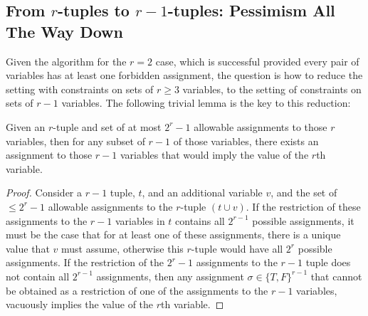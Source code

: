 \documentclass[anon,12pt]{colt2018}
\begin{document}
\subsection{From $r$-tuples to $r-1$-tuples: Pessimism All The Way Down}\label{sec:intuitRed} 

Given the algorithm for the $r=2$ case, which is successful provided every pair of variables has at least one forbidden assignment, the question is how to reduce the setting with constraints on sets of $r \ge 3$ variables, to the setting of constraints on sets of $r-1$ variables.   The following trivial lemma is the key to this reduction:

\begin{lemma}\label{lemma:eitherway}
Given an $r$-tuple and set of at most $2^{r}-1$ allowable assignments to those $r$ variables, then for any subset of $r-1$ of those variables, there exists an assignment to those $r-1$ variables that would imply the value of the $r$th variable.  
\end{lemma}
\begin{proof}
Consider a $r-1$ tuple, $t$, and an additional variable $v$, and the set of $\le 2^{r}-1$ allowable assignments to the $r$-tuple $(t \cup v)$.  If the restriction of these assignments to the $r-1$ variables in $t$ contains all $2^{r-1}$ possible assignments, it must be the case that for at least one of these assignments, there is a unique value that $v$ must assume, otherwise this $r$-tuple would have all $2^r$ possible assignments.   If the restriction of the $2^r - 1$ assignments to the $r-1$ tuple does not contain all $2^{r-1}$ assignments, then any assignment $\sigma \in \{T,F\}^{r-1}$ that cannot be obtained as a restriction of one of the assignments to the $r-1$ variables, vacuously implies the value of the $r$th variable.
\end{proof}
\end{document}
